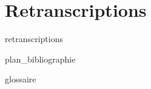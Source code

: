 \chapter{Retranscriptions}
\label{anx:retrans}
{retranscriptions}


\label{refs}
{plan_bibliographie}

\label{gloss}
{glossaire}


